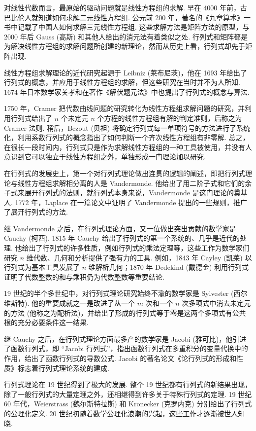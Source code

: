 \documentclass[UTF8,12pt,a4paper,fontset=fandol]{ctexart}
\begin{document}
对线性代数而言，最原始的驱动问题就是线性方程组的求解. 早在 4000 年前，古巴比伦人就知道如何求解二元线性方程组. 公元前 200 年，著名的《九章算术》一书中记载了中国人如何求解三元线性方程组. 这些求解方法是矩阵方法的原型，与 2000 年后 Gauss (高斯) 和其他人给出的消元法有着类似之处. 行列式和矩阵都是为解决线性方程组的求解问题所创建的新理论，然而从历史上看，行列式却先于矩阵出现.

线性方程组求解理论的近代研究起源于 Leibniz (莱布尼茨)，他在 1693 年给出了行列式的概念，并应用于线性方程组的求解，但这些研究在当时并不为人所知. 1674 年日本数学家关孝和在著作《解伏题元法》中也提出了行列式的概念与算法.

1750 年，Cramer 把代数曲线问题的研究转化为线性方程组求解问题的研究，并利用行列式给出了 $n$ 个未定元 $n$ 个方程的线性方程组有解的判定准则，后称之为 Cramer 法则. 稍后，Bezout (贝祖) 将确定行列式每一单项符号的方法进行了系统化，利用系数行列式的概念指出了如何判断一个齐次线性方程组有非零解. 总之，在很长一段时间内，行列式只是作为求解线性方程组的一种工具被使用，并没有人意识到它可以独立于线性方程组之外，单独形成一门理论加以研究.

在行列式的发展史上，第一个对行列式理论做出连贯的逻辑的阐述，即把行列式理论与线性方程组求解相分离的人是 Vandermonde. 他给出了用二阶子式和它们的余子式来展开行列式的法则，就行列式本身来说，Vandermonde 是这门理论的奠基人. 1772 年，Laplace 在一篇论文中证明了 Vandermonde 提出的一些规则，推广了展开行列式的方法.

继 Vandermonde 之后，在行列式理论方面，又一位做出突出贡献的数学家是 Cauchy (柯西). 1815 年 Cauchy 给出了行列式的第一个系统的、几乎是近代的处理. 他给出了行列式的许多性质，例如行列式的乘法定理等，这些工作为数学家们研究 $n$ 维代数、几何和分析提供了强有力的工具. 例如，1843 年 Cayley (凯莱) 以行列式为基本工具发展了 $n$ 维解析几何；1870 年 Dedekind (戴德金) 利用行列式证明了代数整数的和与乘积仍为代数整数等重要结论.

19 世纪的半个多世纪中，对行列式理论研究始终不渝的数学家是 Sylvester (西尔维斯特). 他的重要成就之一是改进了从一个 $m$ 次和一个 $n$ 次多项式中消去未定元的方法 (他称之为配析法)，并给出了形成的行列式等于零是这两个多项式有公共根的充分必要条件这一结果.

继 Cauchy 之后，在行列式理论方面最多产的数学家是 Jacobi (雅可比)，他引进了函数行列式，即 ``Jacobi 行列式''，指出函数行列式在多重积分的变量代换中的作用，给出了函数行列式的导数公式. Jacobi 的著名论文《论行列式的形成和性质》标志着行列式理论系统的建成.

行列式理论在 19 世纪得到了极大的发展. 整个 19 世纪都有行列式的新结果出现，除了一般行列式的大量定理之外，还相继得到许多关于特殊行列式的定理. 19 世纪 60 年代，Weierstrass (魏尔斯特拉斯) 和 Kronecker (克罗内克) 分别给出了行列式的公理化定义. 20 世纪初随着数学公理化浪潮的兴起，这些工作才逐渐被世人知晓.
\end{document}
